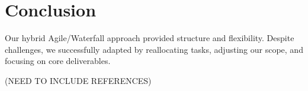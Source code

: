 \section{Conclusion}
Our hybrid Agile/Waterfall approach provided structure and flexibility. Despite challenges, we successfully adapted by reallocating tasks, adjusting our scope, and focusing on core deliverables.

(NEED TO INCLUDE REFERENCES)




